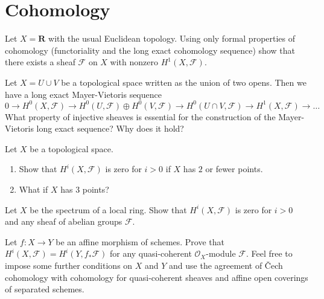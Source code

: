 \section{Cohomology}
\label{section-cohomology}

\begin{exercise}
\label{exercise-cohomology-not-zero}
Let $X = \mathbf{R}$ with the usual Euclidean topology.
Using only formal properties of cohomology (functoriality
and the long exact cohomology sequence) show that there
exists a sheaf $\mathcal{F}$ on $X$ with nonzero $H^1(X, \mathcal{F})$.
\end{exercise}

\begin{exercise}
\label{exercise-mayer-vietoris}
Let $X = U \cup V$ be a topological space written as the
union of two opens. Then we have a long exact
Mayer-Vietoris sequence
$$
0 \to
H^0(X, \mathcal{F}) \to
H^0(U, \mathcal{F}) \oplus H^0(V, \mathcal{F}) \to
H^0(U \cap V, \mathcal{F}) \to
H^1(X, \mathcal{F}) \to \ldots
$$
What property of injective sheaves is essential for the construction
of the Mayer-Vietoris long exact sequence? Why does it hold?
\end{exercise}

\begin{exercise}
\label{exercise-cohomology-two-point-space}
Let $X$ be a topological space.
\begin{enumerate}
\item Show that $H^i(X, \mathcal{F})$ is zero for $i > 0$
if $X$ has $2$ or fewer points.
\item What if $X$ has $3$ points?
\end{enumerate}
\end{exercise}

\begin{exercise}
\label{exercise-cohomology-spec-local-ring}
Let $X$ be the spectrum of a local ring. Show that
$H^i(X, \mathcal{F})$ is zero for $i > 0$ and any
sheaf of abelian groups $\mathcal{F}$.
\end{exercise}

\begin{exercise}
\label{exercise-affine-morphism}
Let $f : X \to Y$ be an affine morphism of schemes.
Prove that $H^i(X, \mathcal{F}) = H^i(Y, f_*\mathcal{F})$
for any quasi-coherent $\mathcal{O}_X$-module $\mathcal{F}$.
Feel free to impose some further conditions on $X$ and $Y$
and use the agreement of {\v C}ech cohomology with cohomology
for quasi-coherent sheaves and affine open coverings of separated schemes.
\end{exercise}

